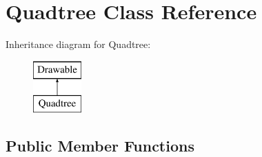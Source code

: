 \hypertarget{class_quadtree}{}\section{Quadtree Class Reference}
\label{class_quadtree}
Inheritance diagram for Quadtree\+:\begin{figure}[H]
\begin{center}
\leavevmode
\includegraphics[height=2.000000cm]{class_quadtree}
\end{center}
\end{figure}
\subsection*{Public Member Functions}
